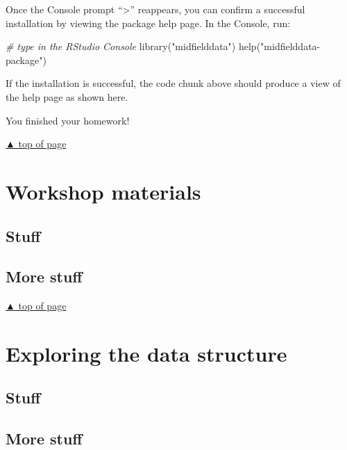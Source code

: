 \documentclass[
]{book}
\newenvironment{Shaded}{\begin{snugshade}}{\end{snugshade}}
\newcommand{\CommentTok}[1]{\textcolor[rgb]{0.56,0.35,0.01}{\textit{#1}}}
\newcommand{\FunctionTok}[1]{\textcolor[rgb]{0.00,0.00,0.00}{#1}}
\newcommand{\NormalTok}[1]{#1}
\newcommand{\StringTok}[1]{\textcolor[rgb]{0.31,0.60,0.02}{#1}}
\begin{document}
Once the Console prompt ``\textgreater{}'' reappears, you can confirm a successful installation by viewing the package help page. In the Console, run:

\begin{Shaded}
\begin{Highlighting}[]
\CommentTok{\# type in the RStudio Console  }
\FunctionTok{library}\NormalTok{(}\StringTok{"midfielddata"}\NormalTok{)}
\FunctionTok{help}\NormalTok{(}\StringTok{"midfielddata{-}package"}\NormalTok{)}
\end{Highlighting}
\end{Shaded}

If the installation is successful, the code chunk above should produce a view of the help page as shown here.

You finished your homework!

\protect\hyperlink{install-everything}{▲ top of page}

\hypertarget{materials}{%
\chapter{Workshop materials}\label{materials}}

\hypertarget{stuff}{%
\section{Stuff}\label{stuff}}

\hypertarget{more-stuff}{%
\section{More stuff}\label{more-stuff}}

\protect\hyperlink{materials}{▲ top of page}

\hypertarget{stories}{%
\chapter{Exploring the data structure}\label{stories}}

\hypertarget{stuff-1}{%
\section{Stuff}\label{stuff-1}}

\hypertarget{more-stuff-1}{%
\section{More stuff}\label{more-stuff-1}}
\end{document}
